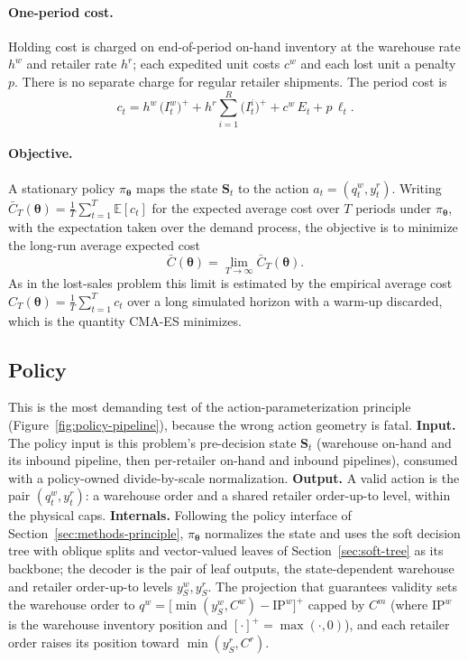 \documentclass[11pt]{article}
\newcommand{\btheta}{\boldsymbol{\theta}}
\begin{document}
\paragraph{One-period cost.}
Holding cost is charged on end-of-period on-hand inventory at the warehouse rate $h^w$ and
retailer rate $h^r$; each expedited unit costs $c^w$ and each lost unit a penalty $p$. There is no
separate charge for regular retailer shipments. The period cost is
\begin{equation}
  c_t = h^w\,\big(I^w_t\big)^+ + h^r \sum_{i=1}^{R}\big(I^i_t\big)^+ + c^w\,E_t + p\,\ell_t .
  \label{eq:me-cost}
\end{equation}

\paragraph{Objective.}
A stationary policy $\pi_{\btheta}$ maps the state $\mathbf S_t$ to the action
$a_t=(q^w_t,y^r_t)$. Writing $\bar C_T(\btheta)=\tfrac1T\sum_{t=1}^{T}\mathbb E[c_t]$ for the
expected average cost over $T$ periods under $\pi_{\btheta}$, with the expectation taken over the
demand process, the objective is to minimize the long-run average expected cost
\begin{equation*}
  \bar C(\btheta) = \lim_{T\to\infty} \bar C_T(\btheta) .
\end{equation*}
As in the lost-sales problem this limit is estimated by the empirical average cost
$\hat C_T(\btheta)=\tfrac1T\sum_{t=1}^{T}c_t$ over a long simulated horizon with a warm-up
discarded, which is the quantity CMA-ES minimizes.

\FloatBarrier

\subsection{Policy}
\label{sec:me-policy}

This is the most demanding test of the action-parameterization principle (Figure~\ref{fig:policy-pipeline}),
because the wrong action geometry is fatal. \textbf{Input.} The policy input is this problem's
pre-decision state
$\mathbf S_t$ (warehouse on-hand and its inbound pipeline, then per-retailer on-hand and inbound
pipelines), consumed with a policy-owned divide-by-scale normalization. \textbf{Output.} A valid
action is the pair $(q^w_t, y^r_t)$: a warehouse order and a shared retailer order-up-to level, within
the physical caps. \textbf{Internals.} Following the policy interface of
Section~\ref{sec:methods-principle}, $\pi_{\btheta}$ normalizes the state and uses the soft decision
tree with oblique splits and vector-valued leaves of Section~\ref{sec:soft-tree} as its backbone; the
decoder is the pair of leaf outputs, the state-dependent warehouse and retailer order-up-to levels
$y^w_{S},y^r_{S}$. The
projection that guarantees validity sets the warehouse order to
$q^w = \big[\min(y^w_{S},C^w)-\mathrm{IP}^w\big]^+$ capped by $C^m$ (where $\mathrm{IP}^w$ is the
warehouse inventory position and $[\cdot]^+=\max(\cdot,0)$), and each retailer order raises its
position toward $\min(y^r_{S},C^r)$.
\end{document}
